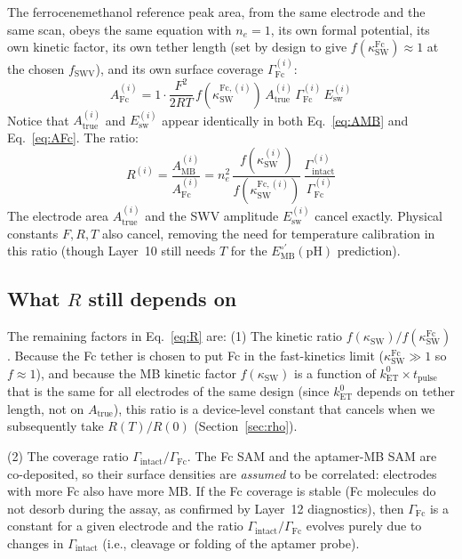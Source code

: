 \documentclass[10pt,a4paper]{article}
\numberwithin{equation}{section}
\newcommand{\Eo}{E^{\circ\prime}}
\newcommand{\kET}{k_{\text{ET}}^{0}}
\newcommand{\Esw}{E_{\text{sw}}}
\newcommand{\AMB}{A_{\text{MB}}}
\newcommand{\AFc}{A_{\text{Fc}}}
\newcommand{\Gtot}{\Gamma_{\text{intact}}}
\begin{document}
The ferrocenemethanol reference peak area, from the same electrode and the
same scan, obeys the same equation with $n_e = 1$, its own formal potential,
its own kinetic factor, its own tether length (set by design to give
$f(\kappa_\text{SW}^\text{Fc}) \approx 1$ at the chosen $f_\text{SWV}$),
and its own surface coverage $\Gamma_\text{Fc}^{(i)}$:
\begin{equation}
  \AFc^{(i)} = 1 \cdot \frac{F^2}{2RT}\,f(\kappa_{\text{SW}}^{\text{Fc},(i)})\,
  A_\text{true}^{(i)}\,\Gamma_\text{Fc}^{(i)}\,\Esw^{(i)}
  \label{eq:AFc}
\end{equation}
Notice that $A_\text{true}^{(i)}$ and $\Esw^{(i)}$ appear identically in
both Eq.~\eqref{eq:AMB} and Eq.~\eqref{eq:AFc}. The ratio:
\begin{equation}
  \boxed{
  R^{(i)} = \frac{\AMB^{(i)}}{\AFc^{(i)}}
  = n_e^2\,\frac{f(\kappa_\text{SW}^{(i)})}{f(\kappa_\text{SW}^{\text{Fc},(i)})}\,
  \frac{\Gtot^{(i)}}{\Gamma_\text{Fc}^{(i)}}
  }
  \label{eq:R}
\end{equation}
The electrode area $A_\text{true}^{(i)}$ and the SWV amplitude $\Esw^{(i)}$
cancel exactly. Physical constants $F, R, T$ also cancel, removing the need
for temperature calibration in this ratio (though Layer~10 still needs $T$
for the $\Eo_\text{MB}(\text{pH})$ prediction).

\subsection{What $R$ still depends on}

The remaining factors in Eq.~\eqref{eq:R} are:
(1) The kinetic ratio $f(\kappa_\text{SW})/f(\kappa_\text{SW}^\text{Fc})$.
Because the Fc tether is chosen to put Fc in the fast-kinetics limit
($\kappa_\text{SW}^\text{Fc} \gg 1$ so $f \approx 1$), and because the
MB kinetic factor $f(\kappa_\text{SW})$ is a function of $\kET \times
t_\text{pulse}$ that is the same for all electrodes of the same design
(since $\kET$ depends on tether length, not on $A_\text{true}$), this ratio
is a device-level constant that cancels when we subsequently take $R(T)/R(0)$
(Section~\ref{sec:rho}).

(2) The coverage ratio $\Gtot/\Gamma_\text{Fc}$.
The Fc SAM and the aptamer-MB SAM are co-deposited, so their surface densities
are \emph{assumed} to be correlated: electrodes with more Fc also have more MB.
If the Fc coverage is stable (Fc molecules do not desorb during the assay, as
confirmed by Layer~12 diagnostics), then $\Gamma_\text{Fc}$ is a constant for a
given electrode and the ratio $\Gtot/\Gamma_\text{Fc}$ evolves purely due to
changes in $\Gtot$ (i.e., cleavage or folding of the aptamer probe).
\end{document}
